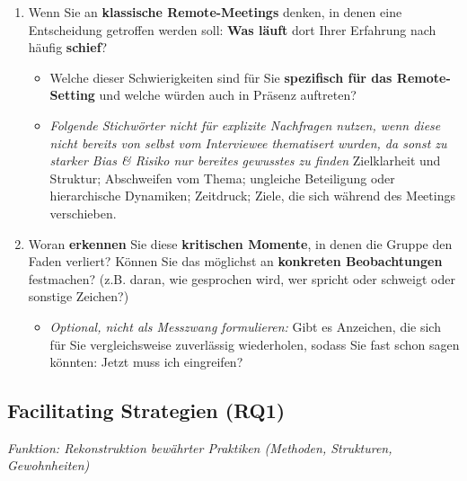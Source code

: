 \begin{enumerate}[label=2.\arabic*, leftmargin=*]
  \item Wenn Sie an \textbf{klassische Remote-Meetings} denken, in denen eine Entscheidung getroffen
    werden soll: \textbf{Was läuft} dort Ihrer Erfahrung nach häufig \textbf{schief}?
    \begin{itemize}[label=\textendash]
      \item Welche dieser Schwierigkeiten sind für Sie \textbf{spezifisch für das Remote-Setting} und
        welche würden auch in Präsenz auftreten?
      \item \textit{Folgende Stichwörter nicht für explizite Nachfragen nutzen, wenn diese nicht bereits von
        selbst vom Interviewee thematisert wurden, da sonst zu starker Bias \& Risiko nur bereites gewusstes zu finden}
        Zielklarheit und Struktur; Abschweifen vom Thema; ungleiche Beteiligung oder hierarchische Dynamiken;
        Zeitdruck; Ziele, die sich während des Meetings verschieben.
    \end{itemize}
  \item Woran \textbf{erkennen} Sie diese \textbf{kritischen Momente}, in denen die Gruppe den Faden
    verliert? Können Sie das möglichst an \textbf{konkreten Beobachtungen} festmachen? (z.B. daran, wie gesprochen
    wird, wer spricht oder schweigt oder sonstige Zeichen?)
    \begin{itemize}[label=\textendash]
      \item \textit{Optional, nicht als Messzwang formulieren:} Gibt es Anzeichen, die
        sich für Sie vergleichsweise zuverlässig wiederholen, sodass Sie fast schon
        sagen könnten: Jetzt muss ich eingreifen?
    \end{itemize}

\end{enumerate}

\subsection*{Facilitating Strategien (RQ1)}
\textit{Funktion: Rekonstruktion bewährter Praktiken (Methoden, Strukturen, Gewohnheiten)}

